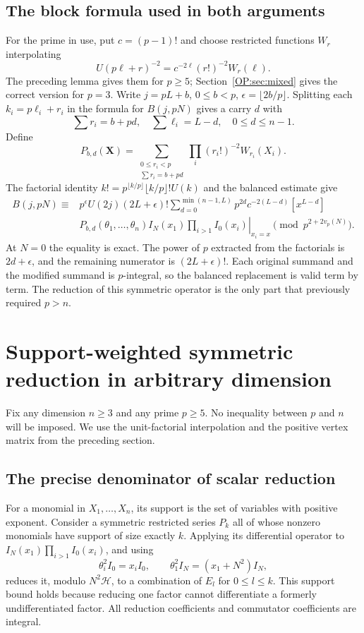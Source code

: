 \documentclass[11pt,a4paper]{article}
\theoremstyle{definition}\newtheorem{definition}[theorem]{Definition}
\theoremstyle{remark}\newtheorem{remark}[theorem]{Remark}
\numberwithin{equation}{section}
\begin{document}
\subsection{The block formula used in both arguments}\label{OP:sec:block}
For the prime in use, put $c=(p-1)!$ and choose restricted functions
$W_r$ interpolating
\[
 U(p\ell+r)^{-2}=c^{-2\ell}(r!)^{-2}W_r(\ell).
\]
The preceding lemma gives them for $p\ge5$; Section~\ref{OP:sec:mixed}
gives the correct version for $p=3$. Write $j=pL+b$, $0\le b<p$,
$\epsilon=\lfloor2b/p\rfloor$. Splitting each $k_i=p\ell_i+r_i$
in the formula for $B(j,pN)$ gives a carry $d$ with
\[
 \sum r_i=b+pd,\quad\sum\ell_i=L-d,\quad0\le d\le n-1.
\]
Define
\[
 P_{b,d}(\mathbf X)=\sum_{\substack{0\le r_i<p\\\sum r_i=b+pd}}
       \prod_i(r_i!)^{-2}W_{r_i}(X_i).
\]
The factorial identity $k!=p^{\lfloor k/p\rfloor}\lfloor k/p\rfloor!U(k)$
and the balanced estimate give
\begin{align}\label{OP:eq:block-bessel}
 B(j,pN)\equiv{}&p^\epsilon U(2j)(2L+\epsilon)!
 \sum_{d=0}^{\min(n-1,L)}p^{2d}c^{-2(L-d)}[x^{L-d}]\\[-4pt]
 &\left.P_{b,d}(\theta_1,\ldots,\theta_n)
 I_N(x_1)\prod_{i>1}I_0(x_i)\right|_{x_i=x}
 \pmod{p^{2+2v_p(N)}}.\nonumber
\end{align}
At $N=0$ the equality is exact. The power of $p$ extracted from the
factorials is $2d+\epsilon$, and the remaining numerator is
$(2L+\epsilon)!$. Each original summand and the modified summand
is $p$-integral, so the balanced replacement is valid term by term.
The reduction of this symmetric operator is the only part that
previously required $p>n$.
\section{Support-weighted symmetric reduction in arbitrary dimension}\label{OP:source-main-4}
\label{OP:sec:support-weighted-all-dimensions}

Fix any dimension $n\ge3$ and any prime $p\ge5$. No inequality between
$p$ and $n$ will be imposed. We use the unit-factorial interpolation and
the positive vertex matrix from the preceding section.

\subsection{The precise denominator of scalar reduction}
For a monomial in $X_1,\ldots,X_n$, its support is the set of variables
with positive exponent. Consider a symmetric restricted series $P_k$
all of whose nonzero monomials have support of size exactly $k$.
Applying its differential operator to
$I_N(x_1)\prod_{i>1}I_0(x_i)$, and using
\[
 \theta_i^2 I_0=x_iI_0,\qquad
 \theta_1^2 I_N=(x_1+N^2)I_N,
\]
reduces it, modulo $N^2\mathcal H$, to a combination of $E_l$ for
$0\le l\le k$. This support bound holds because reducing one factor
cannot differentiate a formerly undifferentiated factor. All reduction
coefficients and commutator coefficients are integral.
\end{document}
